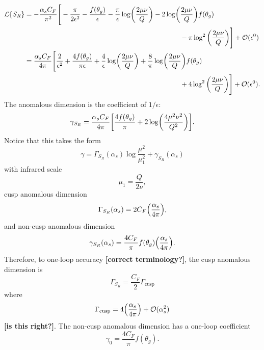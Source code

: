 \documentclass[11pt,twoside,reqno]{amsart}
\theoremstyle{plain}
\theoremstyle{remark}
\theoremstyle{definition}
\theoremstyle{remark}
\theoremstyle{definition}
\theoremstyle{definition}
\newcommand{\cL}{\mathcal{L}}
\newcommand{\cO}{\mathcal{O}}
\newcommand{\cusp}{\mathrm{cusp}}
\begin{document}
	\begin{equation}\label{eq:soft function expanded}
	\begin{aligned}
		\cL\qty{S_R} &= -\frac{\alpha_s C_F}{\pi^2}\Bigg[-\frac{\pi}{2\epsilon^2} - \frac{f(\theta_g)}{\epsilon} - \frac{\pi}{\epsilon}\log(\frac{2\mu \nu}{Q}) - 2\log(\frac{2\mu\nu}{Q})f(\theta_g) \\
			&\hspace{8cm} - \pi\log^2\qty(\frac{2\mu\nu}{Q})\Bigg] + \cO(\epsilon^0) \\
		&= \frac{\alpha_s C_F}{4\pi}\Bigg[\frac{2}{\epsilon^2} + \frac{4f(\theta_g)}{\pi\epsilon} + \frac{4}{\epsilon}\log(\frac{2\mu \nu}{Q}) + \frac{8}{\pi}\log(\frac{2\mu\nu}{Q})f(\theta_g) \\
			&\hspace{8cm}+ 4\log^2\qty(\frac{2\mu\nu}{Q})\Bigg] + \cO(\epsilon^0).
	\end{aligned}
	\end{equation}
	The anomalous dimension is the coefficient of $1/\epsilon$:
	\begin{equation}
		\gamma_{S_R} = \frac{\alpha_s C_F}{4\pi}\qty[\frac{4f(\theta_g)}{\pi} + 2\log(\frac{4\mu^2\nu^2}{Q^2})].
	\end{equation}
	Notice that this takes the form
	\begin{equation}
		\gamma = \Gamma_{S_R}(\alpha_s)\log\frac{\mu^2}{\mu_1^2} + \gamma_{S_R}(\alpha_s)
	\end{equation}
	with infrared scale
	\begin{equation}
		\mu_1 = \frac{Q}{2\nu},
	\end{equation}
	cusp anomalous dimension
	\begin{equation}\label{eq:soft cusp anomalous dimension}
		\Gamma_{S_R}(\alpha_s) = 2C_F \qty(\frac{\alpha_s}{4\pi}),
	\end{equation}
	and non-cusp anomalous dimension
	\begin{equation}
		\gamma_{S_R}(\alpha_s) = \frac{4C_F}{\pi}f(\theta_g)\qty(\frac{\alpha_s}{4\pi}).
	\end{equation}
	Therefore, to one-loop accuracy {\color{red}\textbf{[correct terminology?]}}, the cusp anomalous dimension is
	\begin{equation}
		\Gamma_{S_R} = \frac{C_F}{2} \Gamma_\cusp
	\end{equation}
	where \cite{frye_factorization_2016}
	\begin{equation}
		\Gamma_\cusp = 4\qty(\frac{\alpha_s}{4\pi}) + \cO(\alpha_s^2)
	\end{equation}
	{\color{red}\textbf{[is this right?]}}. The non-cusp anomalous dimension has a one-loop coefficient
	\begin{equation}\label{eq:non-cusp anomalous dimension}
		\boxed{\gamma_0 = \frac{4C_F}{\pi}f(\theta_g).}
	\end{equation}
\end{document}
